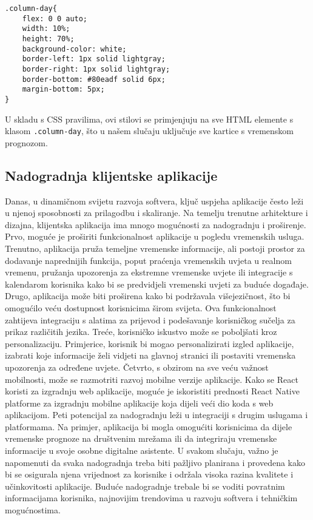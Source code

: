 \documentclass[times, utf8, zavrsni]{fer}
\begin{document}
\begin{verbatim}
.column-day{
    flex: 0 0 auto;
    width: 10%;
    height: 70%;
    background-color: white; 
    border-left: 1px solid lightgray;
    border-right: 1px solid lightgray; 
    border-bottom: #80eadf solid 6px;
    margin-bottom: 5px;
}
\end{verbatim}

U skladu s CSS pravilima, ovi stilovi se primjenjuju na sve HTML elemente s klasom \texttt{.column-day}, što u našem slučaju uključuje sve kartice s vremenskom prognozom.


\subsection{Nadogradnja klijentske aplikacije}
Danas, u dinamičnom svijetu razvoja softvera, ključ uspjeha aplikacije često leži u njenoj sposobnosti za prilagodbu i skaliranje. Na temelju trenutne arhitekture i dizajna, klijentska aplikacija ima mnogo mogućnosti za nadogradnju i proširenje. Prvo, moguće je proširiti funkcionalnost aplikacije u pogledu vremenskih usluga. Trenutno, aplikacija pruža temeljne vremenske informacije, ali postoji prostor za dodavanje naprednijih funkcija, poput praćenja vremenskih uvjeta u realnom vremenu, pružanja upozorenja za ekstremne vremenske uvjete ili integracije s kalendarom korisnika kako bi se predvidjeli vremenski uvjeti za buduće događaje. Drugo, aplikacija može biti proširena kako bi podržavala višejezičnost, što bi omogućilo veću dostupnost korisnicima širom svijeta. Ova funkcionalnost zahtijeva integraciju s alatima za prijevod i podešavanje korisničkog sučelja za prikaz različitih jezika. Treće, korisničko iskustvo može se poboljšati kroz personalizaciju. Primjerice, korisnik bi mogao personalizirati izgled aplikacije, izabrati koje informacije želi vidjeti na glavnoj stranici ili postaviti vremenska upozorenja za određene uvjete. Četvrto, s obzirom na sve veću važnost mobilnosti, može se razmotriti razvoj mobilne verzije aplikacije. Kako se React koristi za izgradnju web aplikacije, moguće je iskoristiti prednosti React Native platforme za izgradnju mobilne aplikacije koja dijeli veći dio koda s web aplikacijom. Peti potencijal za nadogradnju leži u integraciji s drugim uslugama i platformama. Na primjer, aplikacija bi mogla omogućiti korisnicima da dijele vremenske prognoze na društvenim mrežama ili da integriraju vremenske informacije u svoje osobne digitalne asistente. U svakom slučaju, važno je napomenuti da svaka nadogradnja treba biti pažljivo planirana i provedena kako bi se osigurala njena vrijednost za korisnike i održala visoka razina kvalitete i učinkovitosti aplikacije. Buduće nadogradnje trebale bi se voditi povratnim informacijama korisnika, najnovijim trendovima u razvoju softvera i tehničkim mogućnostima.
\end{document}
